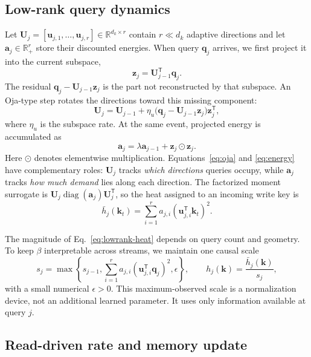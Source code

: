 \documentclass[pdflatex,sn-mathphys-num]{sn-jnl}
\theoremstyle{thmstyleone}
\newcommand{\R}{\mathbb{R}}
\newcommand{\U}{\bm{U}}
\newcommand{\kvec}{\bm{k}}
\newcommand{\qvec}{\bm{q}}
\newcommand{\avec}{\bm{a}}
\newcommand{\zvec}{\bm{z}}
\newcommand{\diag}{\operatorname{diag}}
\begin{document}
\subsection{Low-rank query dynamics}

Let $\U_j=[\bm u_{j,1},\ldots,\bm u_{j,r}]\in\R^{d_k\times r}$ contain $r\ll d_k$ adaptive directions and let $\avec_j\in\R_+^r$ store their discounted energies. When query $\qvec_j$ arrives, we first project it into the current subspace,
\begin{equation}
 \zvec_j=\U_{j-1}^{\mathsf T}\qvec_j.
 \label{eq:projection}
\end{equation}
The residual $\qvec_j-\U_{j-1}\zvec_j$ is the part not reconstructed by that subspace. An Oja-type step rotates the directions toward this missing component:
\begin{equation}
 \U_j=\U_{j-1}+\eta_u
 \bigl(\qvec_j-\U_{j-1}\zvec_j\bigr)\zvec_j^{\mathsf T},
 \label{eq:oja}
\end{equation}
where $\eta_u$ is the subspace rate. At the same event, projected energy is accumulated as
\begin{equation}
 \avec_j=\lambda\avec_{j-1}+\zvec_j\odot\zvec_j.
 \label{eq:energy}
\end{equation}
Here $\odot$ denotes elementwise multiplication. Equations~\eqref{eq:oja} and \eqref{eq:energy} have complementary roles: $\U_j$ tracks \emph{which directions} queries occupy, while $\avec_j$ tracks \emph{how much demand} lies along each direction. The factorized moment surrogate is $\U_j\diag(\avec_j)\U_j^{\mathsf T}$, so the heat assigned to an incoming write key is
\begin{equation}
 \bar h_j(\kvec_t)=
 \sum_{i=1}^{r}a_{j,i}(\bm u_{j,i}^{\mathsf T}\kvec_t)^2.
 \label{eq:lowrank-heat}
\end{equation}

The magnitude of Eq.~\eqref{eq:lowrank-heat} depends on query count and geometry. To keep $\beta$ interpretable across streams, we maintain one causal scale
\begin{equation}
 s_j=\max\!\left\{s_{j-1},
 \sum_{i=1}^{r}a_{j,i}(\bm u_{j,i}^{\mathsf T}\qvec_j)^2,\epsilon\right\},
 \qquad
 h_j(\kvec)=\frac{\bar h_j(\kvec)}{s_j},
 \label{eq:normalization}
\end{equation}
with a small numerical $\epsilon>0$. This maximum-observed scale is a normalization device, not an additional learned parameter. It uses only information available at query $j$.

\subsection{Read-driven rate and memory update}
\end{document}
